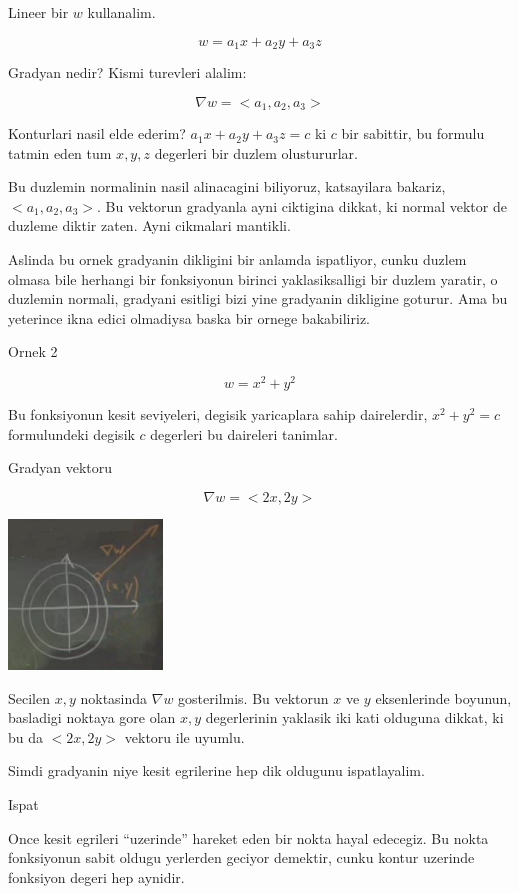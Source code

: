 \documentclass[12pt,fleqn]{article}\usepackage{../common}
\begin{document}
Lineer bir $w$ kullanalim. 

\[ w = a_1 x + a_2 y + a_3 z \]

Gradyan nedir? Kismi turevleri alalim:

\[ \nabla w = <a_1, a_2, a_3> \]

Konturlari nasil elde ederim? $a_1 x + a_2 y + a_3 z  = c$ ki $c$ bir
sabittir, bu formulu tatmin eden tum $x,y,z$ degerleri bir duzlem
olustururlar. 

Bu duzlemin normalinin nasil alinacagini biliyoruz, katsayilara bakariz,
$<a_1,a_2,a_3>$. Bu vektorun gradyanla ayni ciktigina dikkat, ki normal
vektor de duzleme diktir zaten. Ayni cikmalari mantikli. 

Aslinda bu ornek gradyanin dikligini bir anlamda ispatliyor, cunku duzlem
olmasa bile herhangi bir fonksiyonun birinci yaklasiksalligi bir duzlem
yaratir, o duzlemin normali, gradyani esitligi bizi yine gradyanin
dikligine goturur. Ama bu yeterince ikna edici olmadiysa baska bir ornege
bakabiliriz. 

Ornek 2

\[ w = x^2 + y^2 \]

Bu fonksiyonun kesit seviyeleri, degisik yaricaplara sahip dairelerdir,
$x^2 + y^2 = c$ formulundeki degisik $c$ degerleri bu daireleri tanimlar. 

Gradyan vektoru

\[ \nabla w = <2x, 2y> \]

\includegraphics[height=4cm]{12_2.png}

Secilen $x,y$ noktasinda $\nabla w$ gosterilmis. Bu vektorun $x$ ve $y$
eksenlerinde boyunun, basladigi noktaya gore olan $x,y$ degerlerinin
yaklasik iki kati olduguna dikkat, ki bu da $<2x,2y>$ vektoru ile uyumlu. 

Simdi gradyanin niye kesit egrilerine hep dik oldugunu ispatlayalim.

Ispat

Once kesit egrileri ``uzerinde'' hareket eden bir nokta hayal edecegiz. Bu
nokta fonksiyonun sabit oldugu yerlerden geciyor demektir, cunku kontur
uzerinde fonksiyon degeri hep aynidir. 
\end{document}
